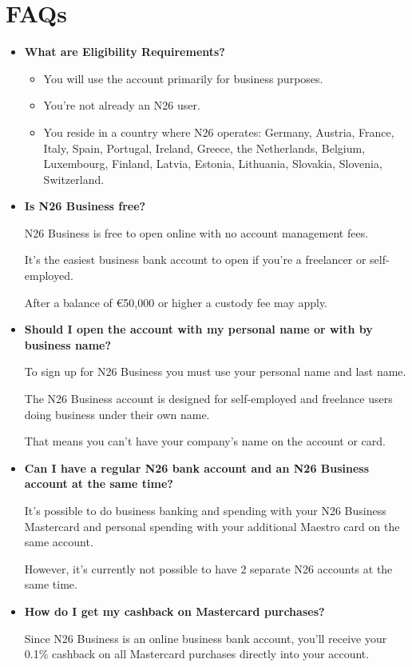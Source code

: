 \documentclass[onsided]{book}
\numberwithin{equation}{section}
\begin{document}
\section{FAQs}
\begin{itemize}
    \item \textbf{What are Eligibility Requirements?}
    \begin{itemize}
        \item You will use the account primarily for business purposes.
        \item You're not already an N26 user.
        \item You reside in a country where N26 operates: Germany, Austria, France, Italy, Spain, Portugal, Ireland, Greece, the Netherlands, Belgium, Luxembourg, Finland, Latvia, Estonia, Lithuania, Slovakia, Slovenia, Switzerland.
    \end{itemize}
    \item \textbf{Is N26 Business free?}
    
    N26 Business is free to open online with no account management fees.
    
    It's the easiest business bank account to open if you're a freelancer or self-employed.
    
    After a balance of €50,000 or higher a custody fee may apply.
    \item \textbf{Should I open the account with my personal name or with by business name?}
    
    To sign up for N26 Business you must use your personal name and last name.
    
    The N26 Business account is designed for self-employed and freelance users doing business under their own name.
    
    That means you can't have your company's name on the account or card.
    \item \textbf{Can I have a regular N26 bank account and an N26 Business account at the same time?}
    
    It's possible to do business banking and spending with your N26 Business Mastercard and personal spending with your additional Maestro card on the same account.
    
    However, it's currently not possible to have 2 separate N26 accounts at the same time.
    \item \textbf{How do I get my cashback on Mastercard purchases?}
    
    Since N26 Business is an online business bank account, you'll receive your 0.1\% cashback on all Mastercard purchases directly into your account.
    

\end{itemize}
\end{document}
